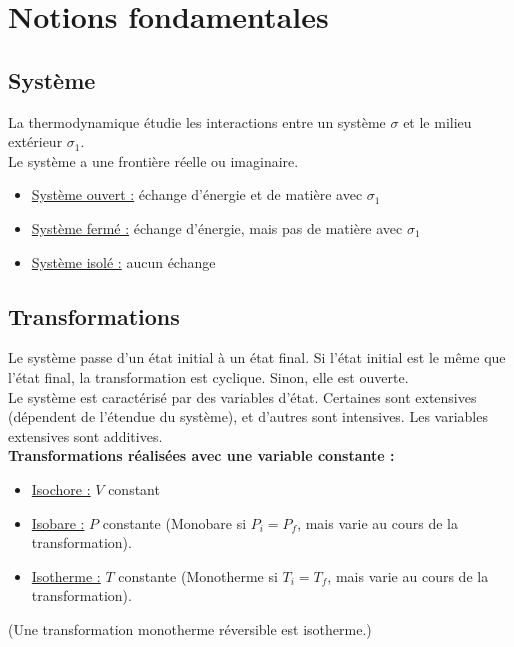 \documentclass[13pt, twoside, a4paper, french]{report}
\begin{document}
        \section{Notions fondamentales}\label{sec:notions-fondamentales}

            \subsection{Système}\label{subsec:systeme}

                La thermodynamique étudie les interactions entre un système $\sigma$ et le milieu extérieur $\sigma_1$.\\
                Le système a une frontière réelle ou imaginaire.
                \vspace{5pt}
                \begin{itemize}
                    \item \underline{Système ouvert :} échange d'énergie et de matière avec $\sigma_1$
                    \item \underline{Système fermé :} échange d'énergie, mais pas de matière avec $\sigma_1$
                    \item \underline{Système isolé :} aucun échange
                \end{itemize}

            \subsection{Transformations}\label{subsec:transformations}

                Le système passe d'un état initial à un état final.
                Si l'état initial est le même que l'état final, la transformation est cyclique.
                Sinon, elle est ouverte.\\

                Le système est caractérisé par des variables d'état.
                Certaines sont extensives (dépendent de l'étendue du système), et d'autres sont intensives.
                Les variables extensives sont additives.\\

                \textbf{Transformations réalisées avec une variable constante :}
                \vspace{5pt}
                \begin{itemize}
                    \item \underline{Isochore :} $V$ constant
                    \item \underline{Isobare :} $P$ constante (Monobare si $P_i = P_f$, mais varie au cours de la transformation).
                    \item \underline{Isotherme :} $T$ constante (Monotherme si $T_i = T_f$, mais varie au cours de la transformation).
                \end{itemize}
                \vspace{5pt}
                (Une transformation monotherme réversible est isotherme.)\\
\end{document}
